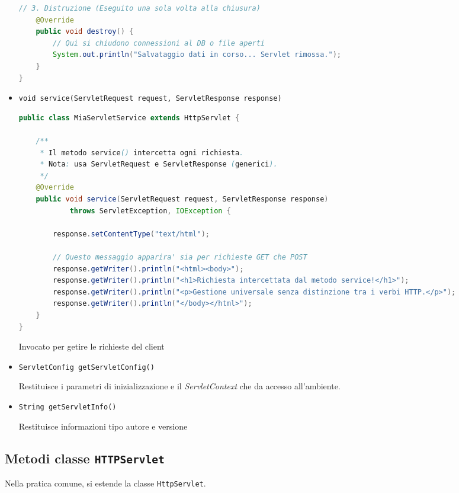 \begin{itemize}
\begin{tcolorbox}[title={Esempio del metodo destroy}, breakable]
\begin{lstlisting}[language=java]
    // 3. Distruzione (Eseguito una sola volta alla chiusura)
    @Override
    public void destroy() {
        // Qui si chiudono connessioni al DB o file aperti
        System.out.println("Salvataggio dati in corso... Servlet rimossa.");
    }
}
        \end{lstlisting}
    \end{tcolorbox}
    \item \texttt{void service(ServletRequest request, ServletResponse response)}

    \begin{tcolorbox}[title={Esempio del metodo service}, breakable]
\begin{lstlisting}[language=java]
public class MiaServletService extends HttpServlet {

    /**
     * Il metodo service() intercetta ogni richiesta.
     * Nota: usa ServletRequest e ServletResponse (generici).
     */
    @Override
    public void service(ServletRequest request, ServletResponse response) 
            throws ServletException, IOException {
        
        response.setContentType("text/html");
        
        // Questo messaggio apparira' sia per richieste GET che POST
        response.getWriter().println("<html><body>");
        response.getWriter().println("<h1>Richiesta intercettata dal metodo service!</h1>");
        response.getWriter().println("<p>Gestione universale senza distinzione tra i verbi HTTP.</p>");
        response.getWriter().println("</body></html>");
    }
}
\end{lstlisting}
\end{tcolorbox}

    Invocato per getire le richieste del client
    \item \texttt{ServletConfig getServletConfig()}

    Restituisce i parametri di inizializzazione e il \textsl{ServletContext} che da accesso all'ambiente.
    \item \texttt{String getServletInfo()}

    Restituisce informazioni tipo autore e versione
\end{itemize}
\subsection{Metodi classe \texttt{HTTPServlet}}
Nella pratica comune, si estende la classe \texttt{HttpServlet}.

